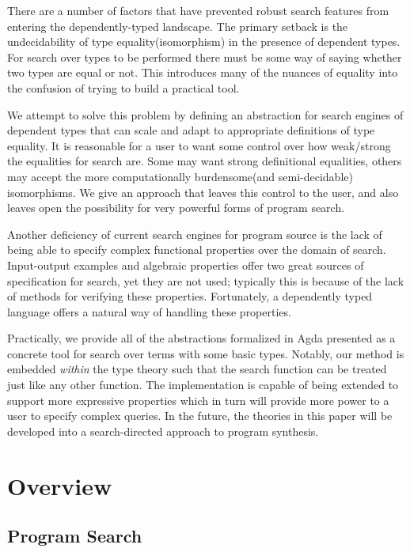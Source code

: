 \documentclass[acmsmall,review,authorversion]{acmart}
\newcommand{\?}{\stackrel{?}{\approx}}
\begin{document}
There are a number of factors that have prevented robust search features from
entering the dependently-typed landscape. The primary setback is the
undecidability of type equality(isomorphism) in the presence of dependent types.
For search over types to be performed there must be some way of saying whether
two types are equal or not. This introduces many of the nuances of equality into
the confusion of trying to build a practical tool.

We attempt to solve this problem by defining an abstraction for
search engines of dependent types that can scale and adapt to appropriate
definitions of type equality. It is reasonable for a user to want some control
over how weak/strong the equalities for search are. Some may want strong
definitional equalities, others may accept the more computationally burdensome(and
semi-decidable) isomorphisms. We give an approach that leaves this control to
the user, and also leaves open the possibility for very powerful forms of
program search.

Another deficiency of current search engines for program source is the lack of
being able to specify complex functional properties over the domain of search.
Input-output examples and algebraic properties offer two great sources of
specification for search, yet they are not used; typically this is because of
the lack of methods for verifying these properties. Fortunately, a dependently
typed language offers a natural way of handling these properties.

Practically, we provide all of the abstractions formalized in
Agda\cite{norell2007towards} presented as a concrete tool for search over terms
with some basic types. Notably, our method is embedded \textit{within} the type
theory such that the search function can be treated just like any other
function. The implementation is capable of being extended to support more
expressive properties which in turn will provide more power to a user to specify
complex queries. In the future, the theories in this paper will be developed
into a search-directed approach to program synthesis.

\section{Overview}

\subsection{Program Search}
\end{document}
